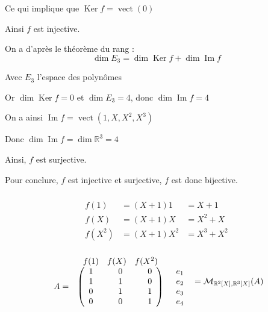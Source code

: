 \documentclass[a4paper,12pt]{article}
\DeclareMathOperator{\Ker}{Ker}
\DeclareMathOperator{\Img}{Im}
\DeclareMathOperator{\vect}{vect}
\DeclareMathOperator{\di}{dim}
\begin{document}
Ce qui implique que $\Ker f = \vect(0)$

Ainsi $f$ est injective.

On a d'après le théorème du rang :
\[
  \di E_3 = \di \Ker f + \di \Img f
\]

Avec $E_3$ l'espace des polynômes

Or $\di \Ker f = 0$ et $\di E_3 = 4$, donc $\di \Img f= 4$

On a ainsi $\Img f = \vect{(1,X,X^2,X^3)}$

Donc $\di \Img f = \di\mathbb{R}^3 = 4$

Ainsi, $f$ est surjective.

Pour conclure, $f$ est injective et surjective, $f$ est donc bijective.

\subsubsection{}

\[
  \begin{array}{lll}
    f(1)   & =(X+1)1   & =X+1     \\
    f(X)   & =(X+1)X   & =X^2+X   \\
    f(X^2) & =(X+1)X^2 & =X^3+X^2
  \end{array}
\]

\subsubsection{}

\[
  \begin{array}{ccc}
      &  \begin{array}{ccc} f(1)&f(X)&f(X^2) \end{array} & \\
  A = & \left(\begin{array}{c@{\hspace*{3em}}c@{\hspace*{3em}}c}
            1 & 0 & 0 \\
            1 & 1 & 0 \\
            0 & 1 & 1 \\
            0 & 0 & 1
          \end{array} \right) 
          & \begin{array}{c} e_1\\ e_2 \\ e_3 \\ e_4 \end{array}
  \end{array}
  = \mathcal{M}_{\mathbb{R}^2[X],\mathbb{R}^3[X]}(A)
\]
\end{document}
